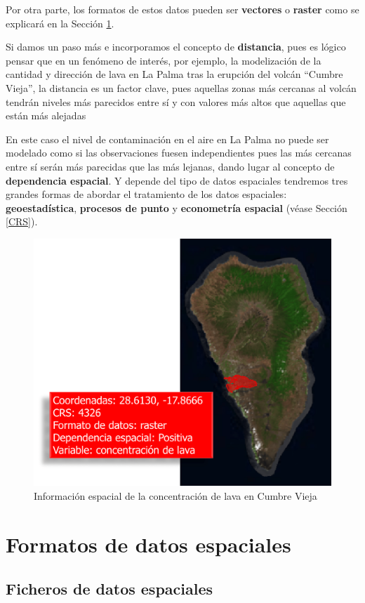\documentclass[
]{report}
\theoremstyle{definition}
\theoremstyle{definition}
\theoremstyle{definition}
\theoremstyle{definition}
\theoremstyle{remark}
\begin{document}
Por otra parte, los formatos de estos datos pueden ser \textbf{vectores} o \textbf{raster}
como se explicará en la Sección \ref{formatos}.

Si damos un paso más e incorporamos el concepto de \textbf{distancia}, pues es lógico
pensar que en un fenómeno de interés, por ejemplo, la modelización de la
cantidad y dirección de lava en La Palma tras la erupción del volcán ``Cumbre
Vieja'', la distancia es un factor clave, pues aquellas zonas más cercanas al
volcán tendrán niveles más parecidos entre sí y con valores más altos que
aquellas que están más alejadas

En este caso el nivel de contaminación en el aire en La Palma no puede ser
modelado como si las observaciones fuesen independientes pues las más cercanas
entre sí serán más parecidas que las más lejanas, dando lugar al concepto de
\textbf{dependencia espacial}. Y depende del tipo de datos espaciales tendremos tres
grandes formas de abordar el tratamiento de los datos espaciales:
\textbf{geoestadística}, \textbf{procesos de punto} y \textbf{econometría espacial} (véase
Sección \ref{CRS}).

\begin{figure}

{\centering \includegraphics[width=0.6\linewidth]{img/Cumbrevieja} 

}

\caption{Información espacial de la concentración de lava en Cumbre Vieja}\label{fig:gis}
\end{figure}

\hypertarget{formatos}{%
\chapter{Formatos de datos espaciales}\label{formatos}}

\hypertarget{ficheros-de-datos-espaciales}{%
\section{Ficheros de datos espaciales}\label{ficheros-de-datos-espaciales}}
\end{document}
